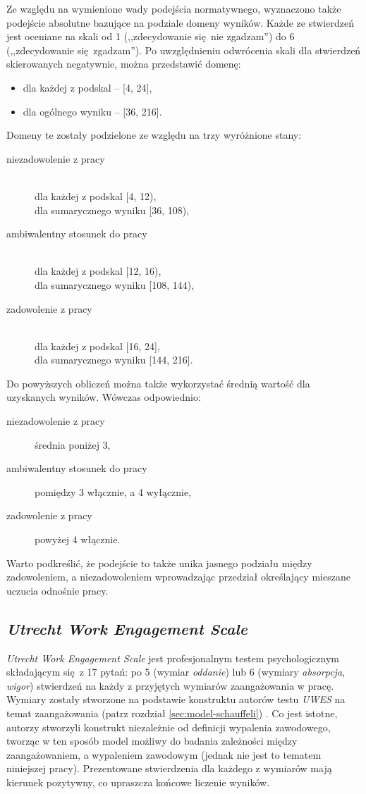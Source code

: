 Ze względu na wymienione wady podejścia normatywnego, wyznaczono także podejście absolutne bazujące na podziale domeny wyników. Każde ze stwierdzeń jest oceniane na skali od 1 (,,zdecydowanie się nie zgadzam'') do 6 (,,zdecydowanie się zgadzam''). Po uwzględnieniu odwrócenia skali dla stwierdzeń skierowanych negatywnie, można przedstawić domenę:
\begin{itemize}
\item dla każdej z podskal -- [4, 24],
\item dla ogólnego wyniku -- [36, 216].
\end{itemize}
Domeny te zostały podzielone ze względu na trzy wyróżnione stany:
\begin{description}
\item[niezadowolenie z pracy] \hfill \\
dla każdej z podskal [4, 12), \hfill \\ dla sumarycznego wyniku [36, 108),
\item[ambiwalentny stosunek do pracy] \hfill \\
dla każdej z podskal [12, 16), \hfill \\ dla sumarycznego wyniku [108, 144),
\item[zadowolenie z pracy] \hfill \\
dla każdej z podskal [16, 24], \hfill \\ dla sumarycznego wyniku [144, 216].
\end{description}

Do powyższych obliczeń można także wykorzystać średnią wartość dla uzyskanych wyników. Wówczas odpowiednio:
\begin{description}
\item[niezadowolenie z pracy] średnia poniżej 3,
\item[ambiwalentny stosunek do pracy] pomiędzy 3 włącznie, a 4 wyłącznie,
\item[zadowolenie z pracy] powyżej 4 włącznie.
\end{description}

Warto podkreślić, że podejście to także unika jasnego podziału między zadowoleniem, a niezadowoleniem wprowadzając przedział określający mieszane uczucia odnośnie pracy.

\subsection{\emph{Utrecht Work Engagement Scale}}
\label{sec:tests-eng}
\emph{Utrecht Work Engagement Scale} jest profesjonalnym testem psychologicznym składającym się z 17 pytań: po 5 (wymiar \textit{oddanie}) lub 6 (wymiary \textit{absorpcja}, \textit{wigor}) stwierdzeń na każdy z przyjętych wymiarów zaangażowania w pracę. Wymiary zostały stworzone na podstawie konstruktu autorów testu \emph{UWES} na temat zaangażowania (patrz rozdział \ref{sec:model-schauffeli}) \cite{schaufeli2001burnout}. Co jest istotne, autorzy stworzyli konstrukt niezależnie od definicji wypalenia zawodowego, tworząc w ten sposób model możliwy do
badania zależności między zaangażowaniem, a wypaleniem zawodowym (jednak nie jest to tematem niniejszej pracy). Prezentowane stwierdzenia dla każdego z wymiarów mają kierunek pozytywny, co upraszcza końcowe liczenie wyników.

